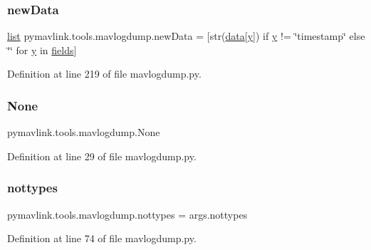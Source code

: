 \subsubsection{\texorpdfstring{newData}{newData}}
{\footnotesize\ttfamily \mbox{\hyperlink{structlist}{list}} pymavlink.\+tools.\+mavlogdump.\+new\+Data = \mbox{[}str(\mbox{\hyperlink{structdata}{data}}\mbox{[}\mbox{\hyperlink{plottingTest_8cpp_a64d0474b77956c0e971da1b6cb1ddacd}{y}}\mbox{]}) if \mbox{\hyperlink{plottingTest_8cpp_a64d0474b77956c0e971da1b6cb1ddacd}{y}} != \char`\"{}timestamp\char`\"{} else \char`\"{}\char`\"{} for \mbox{\hyperlink{plottingTest_8cpp_a64d0474b77956c0e971da1b6cb1ddacd}{y}} in \mbox{\hyperlink{namespacepymavlink_1_1tools_1_1mavlogdump_a8a7ca8e476c5e470f5fff33b76b6abb0}{fields}}\mbox{]}}



Definition at line 219 of file mavlogdump.\+py.

\mbox{\label{namespacepymavlink_1_1tools_1_1mavlogdump_a4f907ac5c5d06d13d8020f0969229a7e}} 
\subsubsection{\texorpdfstring{None}{None}}
{\footnotesize\ttfamily pymavlink.\+tools.\+mavlogdump.\+None}



Definition at line 29 of file mavlogdump.\+py.

\mbox{\label{namespacepymavlink_1_1tools_1_1mavlogdump_a303e0c1229846d262037f631d2356254}} 
\subsubsection{\texorpdfstring{nottypes}{nottypes}}
{\footnotesize\ttfamily pymavlink.\+tools.\+mavlogdump.\+nottypes = args.\+nottypes}



Definition at line 74 of file mavlogdump.\+py.

\mbox{\label{namespacepymavlink_1_1tools_1_1mavlogdump_a939d06fcf84e8a17666d2f1503bc7ea5}} 
